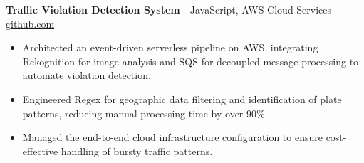\documentclass[11pt]{article}       %
\begin{document}

\textbf{Traffic Violation Detection System}{ - JavaScript, AWS Cloud Services} \hfill \href{https://github.com/Monica20030707/AWS_rekonigition-N-read-database}{github.com} \\
\vspace{-9pt}
\begin{itemize}
  \item Architected an event-driven serverless pipeline on AWS, integrating Rekognition for image analysis and SQS for decoupled message processing to automate violation detection.
  \item Engineered Regex for geographic data filtering and identification of plate patterns, reducing manual processing time by over 90\%.
  \item Managed the end-to-end cloud infrastructure configuration to ensure cost-effective handling of bursty traffic patterns.
\end{itemize}

\end{document}
